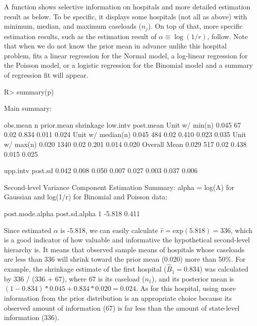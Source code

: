 \documentclass[article]{jss}
\begin{document}
A function  shows selective information on hospitals and more detailed estimation result as below. To be specific, it displays some hospitals (not all as above) with minimum, median, and maximum caseloads ($n_{j}$). On top of that, more specific estimation results, such as the estimation result of $\alpha\equiv\log(1/r)$, follow. Note that when we do not know the prior mean in advance unlike this hospital problem,  fits a linear regression for the Normal model, a log-linear regression for the Poisson model, or a logistic regression for the Binomial model and a summary of regression fit will appear.
\begin{CodeChunk}
\begin{CodeInput}
R> summary(p)
\end{CodeInput}
\begin{CodeOutput}
Main summary:

                  obs.mean    n prior.mean shrinkage low.intv post.mean
Unit w/ min(n)       0.045   67       0.02     0.834    0.011     0.024
Unit w/ median(n)    0.045  484       0.02     0.410    0.023     0.035
Unit w/ max(n)       0.020 1340       0.02     0.201    0.014     0.020
Overall Mean         0.029  517       0.02     0.438    0.015     0.025

                  upp.intv post.sd
                     0.042   0.008
                     0.050   0.007
                     0.027   0.003
                     0.037   0.006

Second-level Variance Component Estimation Summary:
alpha = log(A) for Gaussian and log(1/r) for Binomial and Poisson data:

  post.mode.alpha post.sd.alpha
1          -5.818         0.411
\end{CodeOutput}
\end{CodeChunk}
Since estimated $\alpha$ is -5.818, we can easily calculate $\hat{r}=\textrm{exp}(5.818)=336$, which is a good indicator of how valuable and informative the hypothetical second-level hierarchy is. It means that observed sample means of hospitals whose caseloads are less than 336 will shrink toward the prior mean (0.020) more than 50\%. For example, the shrinkage estimate of the first hospital ($\hat{B}_{1}= 0.834$) was calculated by 336 / (336 + 67), where 67 is its caseload ($n_{1}$), and its posterior mean is $(1-0.834)*0.045 + 0.834 * 0.020=0.024$. As for this hospital, using more information from the prior distribution is an appropriate choice because its observed amount of information (67) is far less than the amount of state-level information (336).
\end{document}
